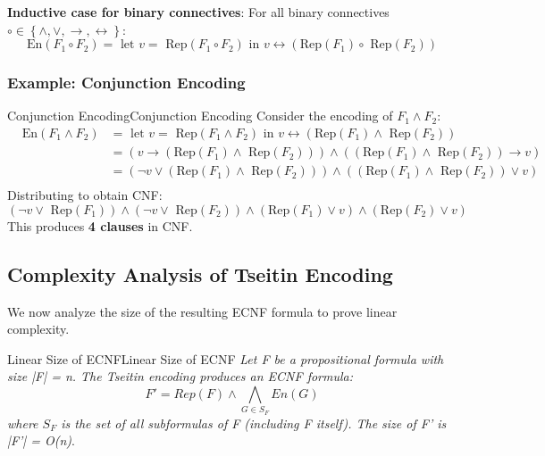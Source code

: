 \documentclass[a4paper]{article}
\theoremstyle{definition}
\begin{document}
\textbf{Inductive case for binary connectives}:
\vspace{1em}
\noindent 
\newline
For all binary connectives \( \circ \in \left\{ \wedge, \vee, \rightarrow, \leftrightarrow \right\} \):
\[
    \text{En}(F_1 \circ F_2) = \text{ let } v = \text{ Rep}(F_1 \circ F_2) \text{ in } v \leftrightarrow (\text{Rep}(F_1) \circ \text{ Rep}(F_2))
\]
\subsubsection{Example: Conjunction Encoding}
\begin{example}{Conjunction Encoding}{Conjunction Encoding}
Consider the encoding of \( F_1 \wedge F_2 \):
\begin{align*}
    & \text{En}(F_1 \wedge F_2) & = \text{ let } v = \text{ Rep}(F_1 \wedge F_2) \text{ in } v \leftrightarrow (\text{Rep}(F_1) \wedge \text{ Rep}(F_2)) \\
    & & = (v \rightarrow (\text{Rep}(F_1) \wedge \text{ Rep}(F_2))) \wedge ((\text{Rep}(F_1) \wedge \text{ Rep}(F_2)) \rightarrow v) \\
    & & = (\lnot v \vee (\text{Rep}(F_1) \wedge \text{ Rep}(F_2))) \wedge ((\text{Rep}(F_1) \wedge \text{ Rep}(F_2)) \vee v) \\
\end{align*}
Distributing to obtain CNF:
\[
  (\lnot v \vee \text{ Rep}(F_1)) \wedge (\lnot v \vee \text{ Rep}(F_2)) \wedge (\text{Rep}(F_1) \vee v) \wedge (\text{Rep}(F_2) \vee v)
\]
This produces \textbf{4 clauses} in CNF.
\end{example}
\subsection{Complexity Analysis of Tseitin Encoding}
We now analyze the size of the resulting ECNF formula to prove linear complexity.
\begin{theorem}{Linear Size of ECNF}{Linear Size of ECNF}
\textit{Let F be a propositional formula with size |F| = n. The Tseitin encoding produces an ECNF formula:}
\[
  F' = Rep(F) \wedge \bigwedge_{G \in S_F} En(G)
\]
\textit{where \( S_F \) is the set of all subformulas of F (including F itself). The size of F' is |F'| = O(n)}.
\end{theorem}
\end{document}
